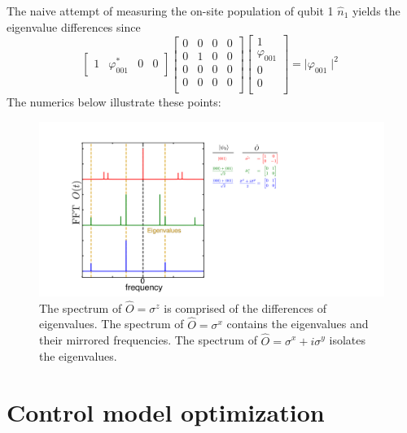 The naive attempt of measuring the on-site population of qubit 1 $\hat{n}_1$ yields the eigenvalue differences since
\begin{equation}
    \begin{bmatrix}
        1 & \varphi_{001}^* & 0 & 0
    \end{bmatrix}
    \begin{bmatrix}
        0 & 0 & 0 & 0 \\
        0 & 1 & 0 & 0 \\
        0 & 0 & 0 & 0 \\
        0 & 0 & 0 & 0 \\
    \end{bmatrix}
    \begin{bmatrix}
        1 \\
        \varphi_{001} \\
        0 \\
        0 \\
    \end{bmatrix}
    = \mid \varphi_{001} \mid^{2}
\end{equation}
The numerics below illustrate these points:
\begin{figure}[h]
    \begin{center}
        \includegraphics[width=250 mm]{./PDF/mbr_numerics_3qubit_o_psi0.pdf}
    \end{center}
    \caption{
    The spectrum of $\hat{O} = \sigma^z$ is comprised of the differences of eigenvalues.
    The spectrum of $\hat{O} = \sigma^x$ contains the eigenvalues and their mirrored frequencies.
    The spectrum of $\hat{O} = \sigma^x + i \sigma^y$ isolates the eigenvalues.
    }
    \label{mbr_peaks_numerics}
\end{figure}

\section{Control model optimization}


